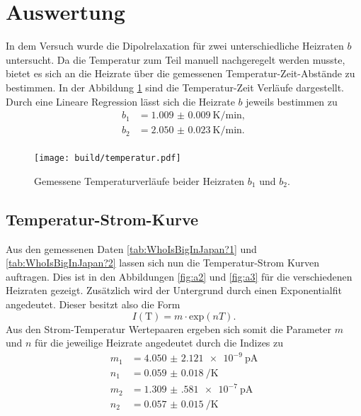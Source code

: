 \section{Auswertung}

In dem Versuch wurde die Dipolrelaxation für zwei unterschiedliche Heizraten $b$ untersucht. Da die Temperatur zum Teil manuell nachgeregelt werden musste, bietet es sich an die Heizrate über
die gemessenen Temperatur-Zeit-Abstände zu bestimmen. In der Abbildung \ref{fig:a1} sind die Temperatur-Zeit Verläufe dargestellt. Durch eine Lineare Regression lässt sich die Heizrate $b$ jeweils bestimmen zu
\begin{align*}
    b_1 &= \SI{1.009(9)}{\kelvin\per\minute},\\
    b_2 &= \SI{2.050(23)}{\kelvin\per\minute}.\\
\end{align*}
\begin{figure}
    \centering
    \texttt{[image: build/temperatur.pdf]}
    \caption{Gemessene Temperaturverläufe beider Heizraten $b_1$ und $b_2$.
            }
    \label{fig:a1}
\end{figure}
\subsection{Temperatur-Strom-Kurve}

Aus den gemessenen Daten \ref{tab:WhoIsBigInJapan?1} und \ref{tab:WhoIsBigInJapan?2} lassen sich nun die Temperatur-Strom Kurven auftragen. Dies ist in den Abbildungen \ref{fig:a2} und \ref{fig:a3} für die verschiedenen Heizraten gezeigt. Zusätzlich wird der Untergrund durch einen Exponentialfit angedeutet. 
Dieser besitzt also die Form
\begin{equation*}
I(\text{T}) = m \cdot \text{exp} \left(nT\right).
\end{equation*}
Aus den Strom-Temperatur Wertepaaren ergeben sich somit die Parameter $m$ und $n$ für die jeweilige Heizrate angedeutet durch die Indizes zu
\begin{align*}
m_1 &= \SI{4.050(2121)e-9}{\pico\ampere}\\  
n_1 &= \SI{0.059(18)}{\per\kelvin}\\ 
m_2 &= \SI{1.309(581)e-7}{\pico\ampere}\\ 
n_2 &= \SI{0.057(15)}{\per\kelvin}\\ 
\end{align*}

